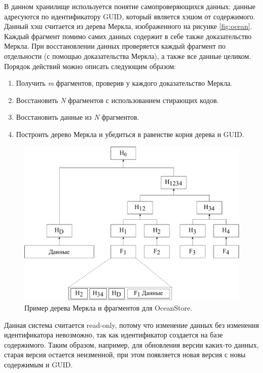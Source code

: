 В данном хранилище используется понятие самопроверяющихся данных\cite{selfverify}: данные адресуются по идентификатору GUID, который является хэшом от содержимого. Данный хэш считается из дерева Меркла, изображенного на рисунке \ref{fig:ocean}. Каждый фрагмент помимо самих данных содержит в себе также доказательство Меркла. При восстановлении данных проверяется каждый фрагмент по отдельности (с помощью доказательства Меркла), а также все данные целиком. Порядок действий можно описать следующим образом:
\begin{enumerate}
    \item Получить \textit{m} фрагментов, проверив у каждого доказательство Меркла.
    \item Восстановить \textit{N} фрагментов с использованием стирающих кодов.
    \item Восстановить данные из \textit{N} фрагментов. %
    \item Построить дерево Меркла и убедиться в равенстве корня дерева и GUID.
\end{enumerate}

\begin{figure}[hbtp]
    \centering
    \includegraphics[width=\textwidth]{img/ocean.pdf}
    \caption{Пример дерева Меркла и фрагментов для OceanStore.}
    \label{fig:mtree}
\end{figure}

Данная система считается read-only, потому что изменение данных без изменения идентификатора невозможно, так как идентификатор создается на базе содержимого. Таким образом, например, для обновления версии каких-то данных, старая версия остается неизменной, при этом появляется новая версия с новы содержимым и GUID.

